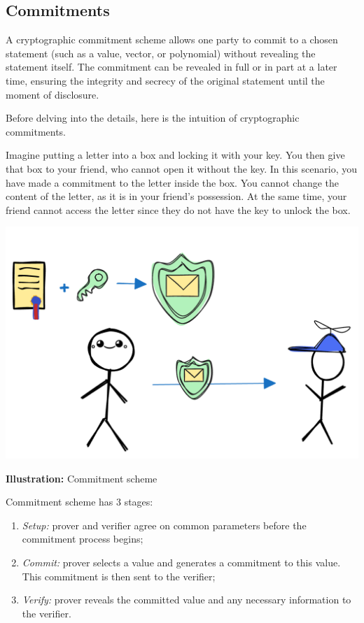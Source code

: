 \documentclass[../lecture-notes.tex]{subfiles}
\begin{document}
\subsection{Commitments}

\begin{definition}
    A cryptographic commitment scheme allows one party to commit to a chosen statement (such as a value, vector, or polynomial) without revealing the statement itself. The commitment can be revealed in full or in part at a later time, ensuring the integrity and secrecy of the original statement until the moment of disclosure.
\end{definition}

Before delving into the details, here is the intuition of cryptographic commitments.

Imagine putting a letter into a box and locking it with your key. 
You then give that box to your friend, who cannot open it without the key.
In this scenario, you have made a commitment to the letter inside the box. 
You cannot change the content of the letter, as it is in your friend's possession. 
At the same time, your friend cannot access the letter since they do not have the key to unlock the box.

\begin{center}
    \centering\includegraphics[width=0.5\linewidth, clip]{images/lecture_5/CommitmentExample.png}

    \scriptsize{\textbf{Illustration:} Commitment scheme}
\end{center}

Commitment scheme has 3 stages:
\begin{enumerate}
    \item \textit{Setup:}  prover and verifier agree on common parameters before the commitment process begins;

    \item \textit{Commit:} prover selects a value and generates a commitment to this value. This commitment is then sent to the verifier;

    \item  \textit{Verify:} prover reveals the committed value and any necessary information to the verifier. 
\end{enumerate}
\end{document}
